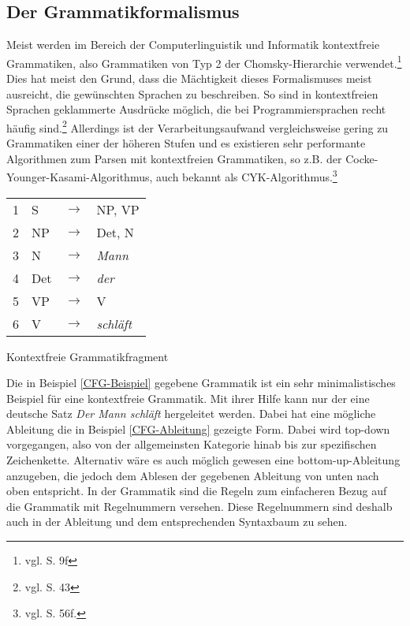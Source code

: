 \documentclass[fontsize=12pt,abstract=on,titlepage,bibliography=totoc,ngerman,listof=totoc]{scrreprt}
\begin{document}
\subsection{Der Grammatikformalismus}
\label{subsec:grammatik}
Meist werden im Bereich der Computerlinguistik und Informatik kontextfreie Grammatiken, also Grammatiken von Typ 2 der Chomsky-Hierarchie verwendet.\footnote{vgl. \cite{SCHOENING2008} S. 9f} Dies hat meist den Grund, dass die Mächtigkeit dieses Formalismuses meist ausreicht, die gewünschten Sprachen zu beschreiben. So sind in kontextfreien Sprachen geklammerte Ausdrücke möglich, die bei Programmiersprachen recht häufig sind.\footnote{vgl. \cite{SCHOENING2008} S. 43} Allerdings ist der Verarbeitungsaufwand vergleichsweise gering zu Grammatiken einer der höheren Stufen und es existieren sehr performante Algorithmen zum Parsen mit kontextfreien Grammatiken, so z.B. der Cocke-Younger-Kasami-Algorithmus, auch bekannt als CYK-Algorithmus.\footnote{vgl. \cite{SCHOENING2008} S. 56f.}
\begin{program}[h]
\begin{tabular}{llll}
1 & S & $\longrightarrow$ & NP, VP \\
2 & NP & $\longrightarrow$ & Det, N \\
3 & N & $\longrightarrow$ & \textit{Mann} \\
4 & Det & $\longrightarrow$ & \textit{der} \\
5 & VP & $\longrightarrow$ & V \\
6 & V  & $\longrightarrow$ & \textit{schläft} \\
\end{tabular}
\caption{Kontextfreie Grammatikfragment}
\label{CFG-Beispiel}
\end{program}
Die in Beispiel \ref{CFG-Beispiel} gegebene Grammatik ist ein sehr minimalistisches Beispiel für eine kontextfreie Grammatik. Mit ihrer Hilfe kann nur der eine deutsche Satz \textit{Der Mann schläft} hergeleitet werden. Dabei hat eine mögliche Ableitung die in Beispiel \ref{CFG-Ableitung} gezeigte Form. Dabei wird top-down vorgegangen, also von der allgemeinsten Kategorie hinab bis zur spezifischen Zeichenkette. Alternativ wäre es auch möglich gewesen eine bottom-up-Ableitung anzugeben, die jedoch dem Ablesen der gegebenen Ableitung von unten nach oben entspricht. In der Grammatik sind die Regeln zum einfacheren Bezug auf die Grammatik mit Regelnummern versehen. Diese Regelnummern sind deshalb auch in der Ableitung und dem entsprechenden Syntaxbaum zu sehen. \par
\end{document}
